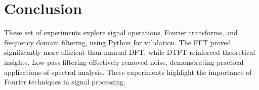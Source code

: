 \documentclass[a4paper,12pt]{article}
\begin{document}
\section*{Conclusion}
These set of experiments explore signal operations, Fourier transforms, and frequency domain filtering, using Python for validation. The FFT proved significantly more efficient than manual DFT, while DTFT reinforced theoretical insights. Low-pass filtering effectively removed noise, demonstrating practical applications of spectral analysis. These experiments highlight the importance of Fourier techniques in signal processing.
\end{document}
